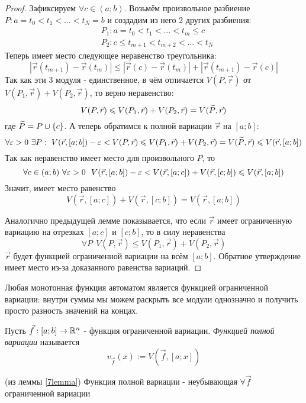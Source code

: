 \begin{proof}
	Зафиксируем $\forall c \in (a; b)$. Возьмём произвольное разбиение $P: a = t_0 < t_1 < \ldots < t_N = b$ и создадим из него 2 других разбиения:
	\begin{align*}
		&{P_1: a = t_0 < t_1 < \ldots < t_m \le c}
		\\
		&{P_2: c \le t_{m + 1}  < t_{m + 2} < \ldots < t_N}
	\end{align*}
	Теперь имеет место следующее неравенство треугольника:
	\[
		|\vec{r}(t_{m + 1}) - \vec{r}(t_m)| \le |\vec{r}(c) - \vec{r}(t_m)| + |\vec{r}(t_{m + 1}) - \vec{r}(c)|
	\]
	Так как эти 3 модуля - единственное, в чём отличается $V(P, \vec{r})$ от $V(P_1, \vec{r}) + V(P_2, \vec{r})$, то верно неравенство:
	\[
		V(P, \vec{r}) \leqslant V(P_1, \vec{r}) + V(P_2, \vec{r}) = V(\widetilde{P}, \vec{r})
	\]
	где $\widetilde{P} = P \cup \{c\}$. А теперь обратимся к полной вариации $\vec{r}$ на $[a; b]$:
	\[
		\forall \varepsilon > 0\ \exists P :\  V(\vec{r}, [a; b]) - \varepsilon < V(P, \vec{r}) \leqslant V(P_1, \vec{r}) + V(P_2, \vec{r}) = V(\widetilde{P}, \vec{r}) \leqslant V(\vec{r}, [a; b])
	\]
	Так как неравенство имеет место для произвольного $P$, то
	\[
		\forall c \in (a; b)\ \forall \varepsilon > 0\ \ V(\vec{r}, [a; b]) - \varepsilon < V(\vec{r}, [a; c]) + V(\vec{r}, [c; b]) \leqslant V(\vec{r}, [a; b])
	\]
	Значит, имеет место равенство
	\[
		V(\vec{r}, [a; c]) + V(\vec{r}, [c; b]) = V(\vec{r}, [a; b])
	\]
	
	Аналогично предыдущей лемме показывается, что если $\vec{r}$ имеет ограниченную вариацию на отрезках $[a; c]$ и $[c; b]$, то в силу неравенства
	\[
		\forall P\ \ V(P, \vec{r}) \le V(P_1, \vec{r}) + V(P_2, \vec{r})
	\]
	$\vec{r}$ будет функцией ограниченной вариации на всём $[a; b]$. Обратное утверждение имеет место из-за доказанного равенства вариаций.
\end{proof}

\begin{note}
	Любая монотонная функция автоматом является функцией ограниченной вариации: внутри суммы мы можем раскрыть все модули однозначно и получить просто разность значений на концах.
\end{note}

\begin{definition}
	Пусть $\vec{f}: [a; b] \to \mathbb{R}^n$ - функция ограниченной вариации. \textit{Функцией полной вариации} называется
	\[
		v_{\vec{f}}(x) := V(\vec{f}, [a; x])
	\]
\end{definition}

\begin{corollary} (из леммы \ref{7lemma})
	Функция полной вариации - неубывающая $\forall \vec{f}$ ограниченной вариации
\end{corollary}

